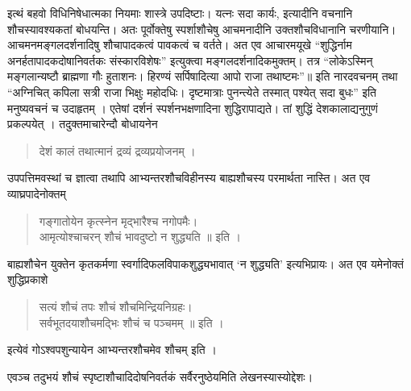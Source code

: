 इत्थं बहवो विधिनिषेधात्मका नियमाः शास्त्रे उपदिष्टाः। यत्नः सदा कार्यः, इत्यादीनि वचनानि शौचस्यावश्यकतां बोधयन्ति। अतः पूर्वोक्तेषु स्पर्शाशौचेषु आचमनादीनि उक्तशौचविधानानि चरणीयानि। आचमनमङ्गलदर्शनादिषु शौचापादकत्वं पावकत्वं च वर्तते। अत एव आचारमयूखे “शुद्धिर्नाम अनर्हतापादकदोषानिवर्तकः संस्कारविशेषः” इत्युक्त्वा मङ्गलदर्शनादिकमुक्तम्। तत्र “लोकेऽस्मिन् मङ्गलान्यष्टौ ब्राह्मणा गौः हुताशनः। हिरण्यं सर्पिषादित्या आपो राजा तथाष्टमः”॥ इति नारदवचनम् तथा “अग्निचित् कपिला सत्री राजा भिक्षुः महोदधिः। दृष्टमात्राः पुनन्त्येते तस्मात् पश्येत् सदा बुधः” इति मनुष्यवचनं च उदाहृतम् । एतेषां दर्शनं स्पर्शनभक्षणादिना शुद्धिरापाद्यते। तां शुद्धिं देशकालाद्यनुगुणं प्रकल्पयेत् । तदुक्तमाचारेन्दौ बोधायनेन 
\begin{verse}
देशं कालं तथात्मानं द्रव्यं द्रव्यप्रयोजनम् । 
\end{verse}
उपपत्तिमवस्थां च ज्ञात्वा तथापि आभ्यन्तरशौचविहीनस्य बाह्यशौचस्य परमार्थता नास्ति। अत एव व्याघ्रपादेनोक्तम् 
\begin{verse}
गङ्गातोयेन कृत्स्नेन मृद्भारैश्च नगोपमैः। \\
आमृत्योश्चाचरन् शौचं भावदुष्टो न शुद्ध्यति ॥ इति ।
\end{verse}
बाह्यशौचेन युक्तेन कृतकर्मणा स्वर्गादिफलविपाकशुद्ध्यभावात् ‘न शुद्ध्यति’ इत्यभिप्रायः। अत एव यमेनोक्तं शुद्धिप्रकाशे 
\begin{verse}
सत्यं शौचं तपः शौचं शौचमिन्द्रियनिग्रहः। \\
सर्वभूतदयाशौचमद्भिः शौचं च पञ्चमम् ॥ इति । 
\end{verse}
इत्येवं गोऽश्वपशुन्यायेन आभ्यन्तरशौचमेव शौचम् इति । 

एवञ्च तदुभयं शौचं स्पृष्टाशौचादिदोषनिवर्तकं सर्वैरनुष्ठेयमिति लेखनस्यास्योद्देशः।

